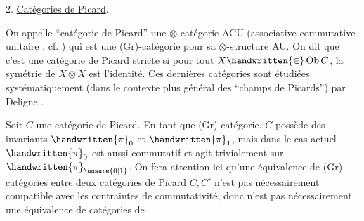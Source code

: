 2. \uline{Catégories de Picard}.

On appelle ``catégorie de Picard'' une $\otimes$-catégorie ACU (associative-commutative-unitaire , cf. \handwritten{[~]}) qui est une (Gr)-catégorie pour sa  $\otimes$-structure AU. On dit que c'est une catégorie de Picard \uline{stricte} si pour tout $X\handwritten{\in}\operatorname{Ob}C$, la symétrie de $X\otimes X$ est l'identité. Ces  dernières catégories sont étudiées systématiquement (dans le contexte plus général des ``champs de Picards'') par Deligne \handwritten{[~]}.

Soit $C$ une catégorie de Picard. En tant que (Gr)-catégorie, $C$ possède des invariants $\handwritten{\pi}_0$ et $\handwritten{\pi}_1$, mais dans le cas actuel $\handwritten{\pi}_0$ est aussi commutatif et agit trivialement sur $\handwritten{\pi}_{\unsure{0|1}}$. On fera attention ici qu'une équivalence de (Gr)-catégories entre deux catégories de Picard $C,C'$ n'est pas nécessairement compatible avec les contraintes de commutativité, donc n'est pas nécessairement une équivalence de catégories de
